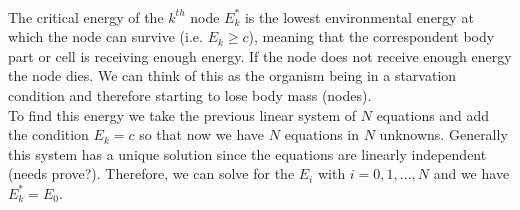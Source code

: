 \documentclass{amsart}
\theoremstyle{plain}
\numberwithin{equation}{section}
\begin{document}
	\\
	The critical energy of the $k^{th}$ node $E^*_k$ is the lowest environmental energy at which the node can survive (i.e. $E_k \geq c$), meaning that the correspondent body part or cell is receiving enough energy. If the node does not receive enough energy the node dies. We can think of this as the organism being in a starvation condition and therefore starting to lose body mass (nodes).\\
To find this energy we take the previous linear system of $N$ equations and add the condition $E_k=c$ so that now we have $N$ equations in $N$ unknowns. Generally this system has a unique solution since the equations are linearly independent (needs prove?). Therefore, we can solve for the $E_i$ with $i=0,1,...,N$ and we have $E^*_k=E_0$.\\
\end{document}
